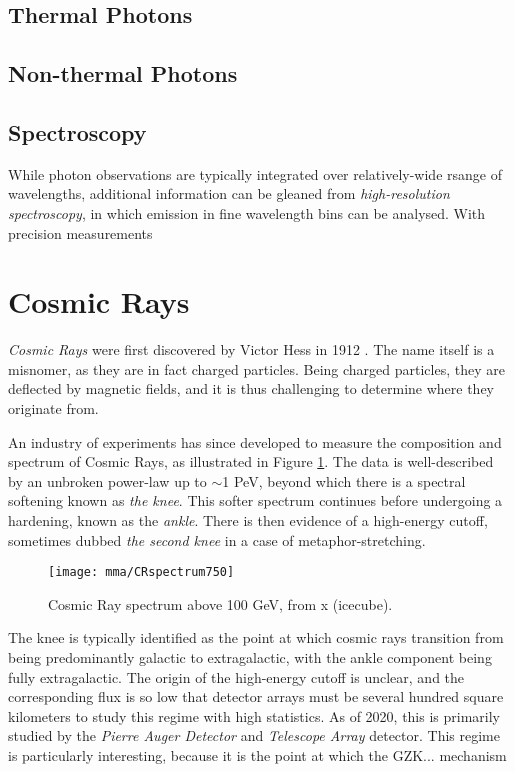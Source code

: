  \subsection{Thermal Photons}

 \subsection{Non-thermal Photons}
 
 \subsection{Spectroscopy}
 
While photon observations are typically integrated over relatively-wide rsange of wavelengths, additional information can be gleaned from \emph{high-resolution spectroscopy}, in which emission in fine wavelength bins can be analysed. With precision measurements  

\section{Cosmic Rays}

\emph{Cosmic Rays} were first discovered by Victor Hess in 1912 . The name itself is a misnomer, as they are in fact charged particles. Being charged particles, they are deflected by magnetic fields, and it is thus challenging to determine where they originate from.

An industry of experiments has since developed to measure the composition and spectrum of Cosmic Rays, as illustrated in Figure \ref{fig:CR_spectrum}. The data is well-described by an unbroken power-law up to $\sim$1 PeV, beyond which there is a spectral softening known as \emph{the knee}. This softer spectrum continues before undergoing a hardening, known as the \emph{ankle}. There is then evidence of a high-energy cutoff, sometimes dubbed \emph{the second knee} in a case of metaphor-stretching.

\begin{figure}[!ht]
	\centering \texttt{[image: mma/CRspectrum750]}
	\caption{Cosmic Ray spectrum above 100 GeV, from x (icecube).}
	\label{fig:CR_spectrum}
\end{figure}

The knee is typically identified as the point at which cosmic rays transition from being predominantly galactic to extragalactic, with the ankle component being fully extragalactic. The origin of the high-energy cutoff is unclear, and the corresponding flux is so low that detector arrays must be several hundred square kilometers to study this regime with high statistics. As of 2020, this is primarily studied by the \emph{Pierre Auger Detector} and \emph {Telescope Array} detector. This regime is particularly interesting, because it is the point at which the GZK... mechanism 

